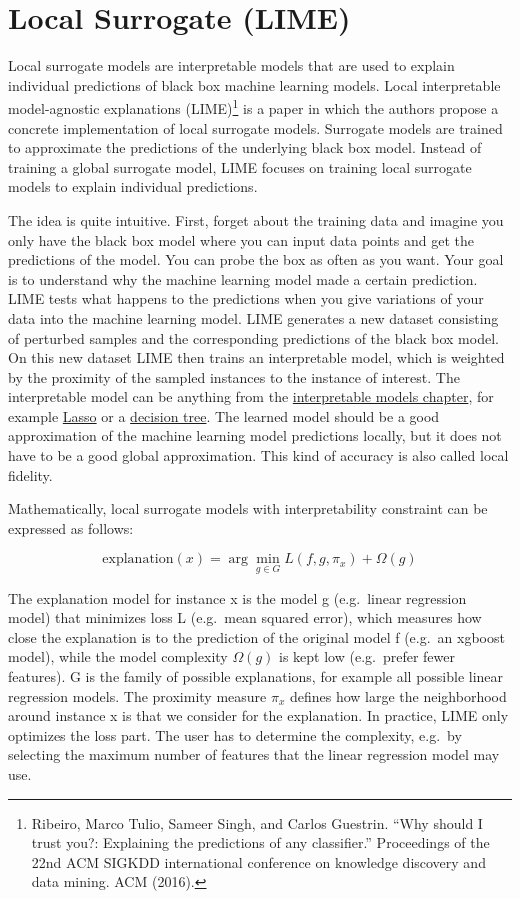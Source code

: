 \documentclass[
  12pt,
]{krantz}
\begin{document}
\newpage

\hypertarget{lime}{%
\section{Local Surrogate (LIME)}\label{lime}}

Local surrogate models are interpretable models that are used to explain individual predictions of black box machine learning models.
Local interpretable model-agnostic explanations (LIME)\footnote{Ribeiro, Marco Tulio, Sameer Singh, and Carlos Guestrin. ``Why should I trust you?: Explaining the predictions of any classifier.'' Proceedings of the 22nd ACM SIGKDD international conference on knowledge discovery and data mining. ACM (2016).} is a paper in which the authors propose a concrete implementation of local surrogate models.
Surrogate models are trained to approximate the predictions of the underlying black box model.
Instead of training a global surrogate model, LIME focuses on training local surrogate models to explain individual predictions.

The idea is quite intuitive.
First, forget about the training data and imagine you only have the black box model where you can input data points and get the predictions of the model.
You can probe the box as often as you want.
Your goal is to understand why the machine learning model made a certain prediction.
LIME tests what happens to the predictions when you give variations of your data into the machine learning model.
LIME generates a new dataset consisting of perturbed samples and the corresponding predictions of the black box model.
On this new dataset LIME then trains an interpretable model, which is weighted by the proximity of the sampled instances to the instance of interest.
The interpretable model can be anything from the \protect\hyperlink{simple}{interpretable models chapter}, for example \protect\hyperlink{lasso}{Lasso} or a \protect\hyperlink{tree}{decision tree}.
The learned model should be a good approximation of the machine learning model predictions locally, but it does not have to be a good global approximation.
This kind of accuracy is also called local fidelity.

Mathematically, local surrogate models with interpretability constraint can be expressed as follows:

\[\text{explanation}(x)=\arg\min_{g\in{}G}L(f,g,\pi_x)+\Omega(g)\]

The explanation model for instance x is the model g (e.g.~linear regression model) that minimizes loss L (e.g.~mean squared error), which measures how close the explanation is to the prediction of the original model f (e.g.~an xgboost model), while the model complexity \(\Omega(g)\) is kept low (e.g.~prefer fewer features).
G is the family of possible explanations, for example all possible linear regression models.
The proximity measure \(\pi_x\) defines how large the neighborhood around instance x is that we consider for the explanation.
In practice, LIME only optimizes the loss part.
The user has to determine the complexity, e.g.~by selecting the maximum number of features that the linear regression model may use.
\end{document}
